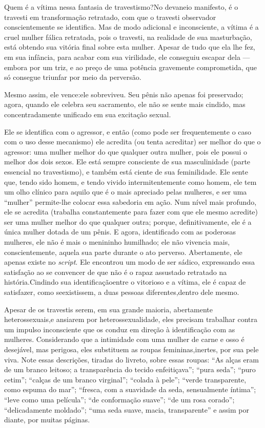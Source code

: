 Quem é a vítima nessa fantasia de travestismo?\idxfetictrav[|(] No devaneio
manifesto, é o travesti em transformação retratado, com que o
travesti observador conscientemente se identifica. Mas de modo
adicional e inconsciente, a vítima é a cruel mulher fálica\idxcastamulh{} retratada,
pois o travesti, na realidade de sua masturbação,\idxmasturt{} está obtendo sua
vitória final sobre esta mulher. Apesar de tudo que ela lhe fez, em sua
infância, para acabar com sua virilidade, ele conseguiu escapar dela
--- embora por um triz, e ao preço de uma potência gravemente
comprometida, que só consegue triunfar por meio da perversão.

Mesmo assim, ele vence:\idxtravemcliv[|(] ele sobreviveu. Seu pênis não apenas foi
preservado; agora, quando ele celebra seu sacramento, ele não se
sente mais cindido, mas concentradamente unificado em sua excitação
sexual.

Ele se identifica com o agressor, e então (como pode ser
frequentemente o caso com o uso desse mecanismo) ele acredita (ou tenta
acreditar) ser melhor do que o agressor: uma mulher melhor do que
qualquer outra mulher, pois ele possui o melhor dos dois sexos. Ele
está sempre consciente de sua masculinidade\idxmascutra{} (parte essencial no
travestismo), e também está ciente de sua feminilidade. Ele sente que,
tendo sido homem, e tendo vivido intermitentemente como homem, ele tem
um olho clínico para aquilo que é o mais apreciado pelas mulheres, e
ser uma ``mulher'' permite-lhe colocar essa
sabedoria em ação. Num nível mais profundo, ele se acredita (trabalha
constantemente para fazer com que ele mesmo acredite) ser uma mulher
melhor do que qualquer outra; porque, definitivamente, ele é a única
mulher dotada de um pênis. E agora, identificado com as poderosas
mulheres, ele não é mais o menininho humilhado; ele não vivencia mais,
conscientemente, aquela sua parte durante o ato perverso. Abertamente,
ele apenas existe no \textit{script}. Ele encontrou um modo de ser
sádico, expressando essa satisfação ao se convencer de que não é o
rapaz assustado retratado na história.\idxtravemmasc[|)] Cindindo sua identificação\idxtravemfant[|)]
entre o vitorioso e a vítima, ele é capaz de satisfazer, como se\idxpornoviti[|)]
existissem, a duas pessoas diferentes,\idxtraumatrae[|)] dentro dele mesmo.\idxpornofant[|)]

Apesar de os travestis serem, em sua grande maioria, abertamente\idxtravemhete{}
heterossexuais,\idxheterotrav[|(] e ansiarem por heterossexualidade, eles precisam
trabalhar contra um impulso inconsciente que os conduz em direção à
identificação com as mulheres. Considerando que a intimidade com uma
mulher de carne e osso é desejável, mas perigosa, eles substituem as
roupas femininas,\idxtravemsimb[|(] inertes, por sua pele viva. Note essas descrições,
tiradas do livreto, sobre essas roupas: ``As alças eram de
um branco leitoso; a transparência do tecido
enfeitiçava''; ``pura seda'';
``puro cetim''; ``calças de um
branco virginal''; ``colada à
pele''; ``verde transparente, como espuma do
mar''; ``fresca, com a suavidade da seda,
sensualmente íntima''; ``leve como uma
película''; ``de conformação
suave''; ``de um rosa corado'';
``delicadamente moldado''; ``uma
seda suave, macia, transparente'' e assim por diante, por
muitas páginas.

